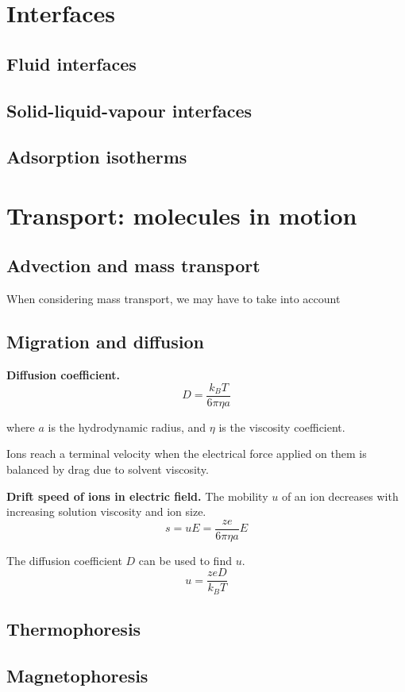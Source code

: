 \section{Interfaces}

\subsection*{Fluid interfaces} %

\subsection*{Solid-liquid-vapour interfaces}

\subsection*{Adsorption isotherms}

\section{Transport: molecules in motion}

\subsection*{Advection and mass transport}

When considering mass transport, we may have to take into account

\subsection*{Migration and diffusion} %

\textbf{Diffusion coefficient.} $$D = \frac{k_B T}{6 \pi \eta a}$$

where $a$ is the hydrodynamic radius, and $\eta$ is the viscosity coefficient.

Ions reach a terminal velocity when the electrical force applied on them is balanced
by drag due to solvent viscosity.
\vspace{\baselineskip}

\textbf{Drift speed of ions in electric field.} The mobility $u$ of an ion decreases with increasing solution viscosity and ion size.
$$s = uE = \frac{ze}{6 \pi \eta a} E$$

The diffusion coefficient $D$ can be used to find $u$.
\begin{equation*}
    u = \frac{zeD}{k_B T}
\end{equation*}

\subsection*{Thermophoresis}

\subsection*{Magnetophoresis}

